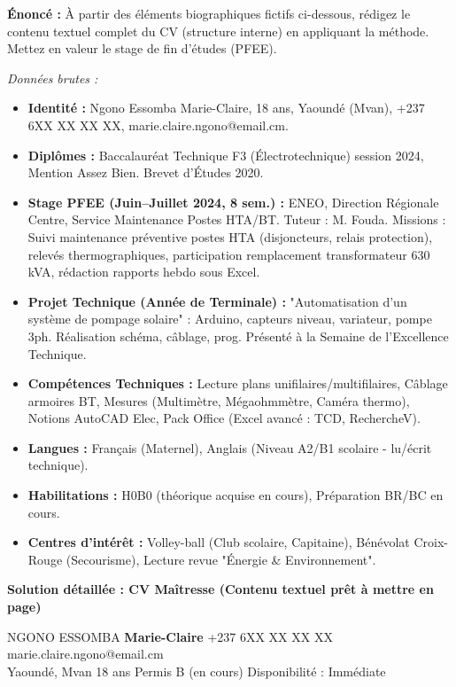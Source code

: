 \documentclass[11pt]{article}
\begin{document}
\begin{exoresolu}
\textbf{Énoncé :} À partir des éléments biographiques fictifs ci-dessous, rédigez le contenu textuel complet du CV (structure interne) en appliquant la méthode. Mettez en valeur le stage de fin d'études (PFEE).

\emph{Données brutes :}
\begin{itemize}
    \item \textbf{Identité :} Ngono Essomba Marie-Claire, 18 ans, Yaoundé (Mvan), +237 6XX XX XX XX, marie.claire.ngono@email.cm.
    \item \textbf{Diplômes :} Baccalauréat Technique F3 (Électrotechnique) session 2024, Mention Assez Bien. Brevet d'Études 2020.
    \item \textbf{Stage PFEE (Juin--Juillet 2024, 8 sem.) :} ENEO, Direction Régionale Centre, Service Maintenance Postes HTA/BT. Tuteur : M. Fouda. Missions : Suivi maintenance préventive postes HTA (disjoncteurs, relais protection), relevés thermographiques, participation remplacement transformateur 630 kVA, rédaction rapports hebdo sous Excel.
    \item \textbf{Projet Technique (Année de Terminale) :} "Automatisation d'un système de pompage solaire" : Arduino, capteurs niveau, variateur, pompe 3ph. Réalisation schéma, câblage, prog. Présenté à la Semaine de l'Excellence Technique.
    \item \textbf{Compétences Techniques :} Lecture plans unifilaires/multifilaires, Câblage armoires BT, Mesures (Multimètre, Mégaohmmètre, Caméra thermo), Notions AutoCAD Elec, Pack Office (Excel avancé : TCD, RechercheV).
    \item \textbf{Langues :} Français (Maternel), Anglais (Niveau A2/B1 scolaire - lu/écrit technique).
    \item \textbf{Habilitations :} H0B0 (théorique acquise en cours), Préparation BR/BC en cours.
    \item \textbf{Centres d'intérêt :} Volley-ball (Club scolaire, Capitaine), Bénévolat Croix-Rouge (Secourisme), Lecture revue "Énergie \& Environnement".
\end{itemize}

\tcblower
\textbf{Solution détaillée : CV Maîtresse (Contenu textuel prêt à mettre en page)}

\noindent \textsc{NGONO ESSOMBA} \textbf{Marie-Claire} \hfill +237 6XX XX XX XX \hfill marie.claire.ngono@email.cm \\
Yaoundé, Mvan \hfill 18 ans \hfill Permis B (en cours) \hfill Disponibilité : Immédiate


\end{exoresolu}
\end{document}
